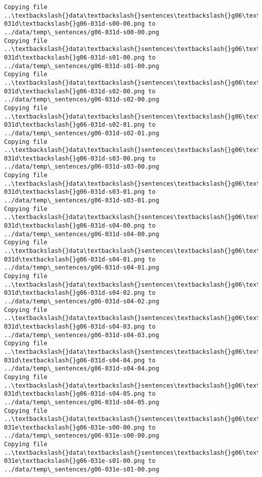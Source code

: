 \documentclass[11pt]{article}
\begin{document}
\begin{Verbatim}[commandchars=\\\{\}]
Copying file ..\textbackslash{}data\textbackslash{}sentences\textbackslash{}g06\textbackslash{}g06-031d\textbackslash{}g06-031d-s00-00.png to
../data/temp\_sentences/g06-031d-s00-00.png
Copying file ..\textbackslash{}data\textbackslash{}sentences\textbackslash{}g06\textbackslash{}g06-031d\textbackslash{}g06-031d-s01-00.png to
../data/temp\_sentences/g06-031d-s01-00.png
Copying file ..\textbackslash{}data\textbackslash{}sentences\textbackslash{}g06\textbackslash{}g06-031d\textbackslash{}g06-031d-s02-00.png to
../data/temp\_sentences/g06-031d-s02-00.png
Copying file ..\textbackslash{}data\textbackslash{}sentences\textbackslash{}g06\textbackslash{}g06-031d\textbackslash{}g06-031d-s02-01.png to
../data/temp\_sentences/g06-031d-s02-01.png
Copying file ..\textbackslash{}data\textbackslash{}sentences\textbackslash{}g06\textbackslash{}g06-031d\textbackslash{}g06-031d-s03-00.png to
../data/temp\_sentences/g06-031d-s03-00.png
Copying file ..\textbackslash{}data\textbackslash{}sentences\textbackslash{}g06\textbackslash{}g06-031d\textbackslash{}g06-031d-s03-01.png to
../data/temp\_sentences/g06-031d-s03-01.png
Copying file ..\textbackslash{}data\textbackslash{}sentences\textbackslash{}g06\textbackslash{}g06-031d\textbackslash{}g06-031d-s04-00.png to
../data/temp\_sentences/g06-031d-s04-00.png
Copying file ..\textbackslash{}data\textbackslash{}sentences\textbackslash{}g06\textbackslash{}g06-031d\textbackslash{}g06-031d-s04-01.png to
../data/temp\_sentences/g06-031d-s04-01.png
Copying file ..\textbackslash{}data\textbackslash{}sentences\textbackslash{}g06\textbackslash{}g06-031d\textbackslash{}g06-031d-s04-02.png to
../data/temp\_sentences/g06-031d-s04-02.png
Copying file ..\textbackslash{}data\textbackslash{}sentences\textbackslash{}g06\textbackslash{}g06-031d\textbackslash{}g06-031d-s04-03.png to
../data/temp\_sentences/g06-031d-s04-03.png
Copying file ..\textbackslash{}data\textbackslash{}sentences\textbackslash{}g06\textbackslash{}g06-031d\textbackslash{}g06-031d-s04-04.png to
../data/temp\_sentences/g06-031d-s04-04.png
Copying file ..\textbackslash{}data\textbackslash{}sentences\textbackslash{}g06\textbackslash{}g06-031d\textbackslash{}g06-031d-s04-05.png to
../data/temp\_sentences/g06-031d-s04-05.png
Copying file ..\textbackslash{}data\textbackslash{}sentences\textbackslash{}g06\textbackslash{}g06-031e\textbackslash{}g06-031e-s00-00.png to
../data/temp\_sentences/g06-031e-s00-00.png
Copying file ..\textbackslash{}data\textbackslash{}sentences\textbackslash{}g06\textbackslash{}g06-031e\textbackslash{}g06-031e-s01-00.png to
../data/temp\_sentences/g06-031e-s01-00.png

\end{Verbatim}
\end{document}

